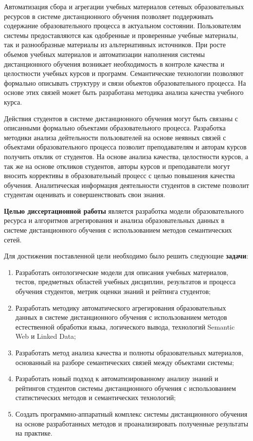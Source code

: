 Автоматизация сбора и агрегации учебных материалов сетевых образовательных ресурсов в системе дистанционного обучения позволяет поддерживать содержание образовательного процесса в актуальном состоянии. Пользователям системы предоставляются как одобренные и проверенные учебные материалы, так и разнообразные материалы из альтернативных источников. При росте объемов учебных материалов и автоматизации наполнения системы дистанционного обучения возникает необходимость в контроле качества и целостности учебных курсов и программ. Семантические технологии позволяют формально описывать структуру и связи объектов образовательного процесса. На основе этих связей может быть разработана методика анализа качества учебного курса. 

Действия студентов в системе дистанционного обучения могут быть связаны с описанными формально объектами образовательного процесса. Разработка методики анализа дейтельности пользователей на основе неявных связей с объектами образовательного процесса позволит преподавателям и авторам курсов получить отклик от студентов. На основе анализа качества, целостности курсов, а так же на основе откликов студентов, авторы курсов и преподаватели могут вносить коррективы в образовательный процесс с целью повышения качества обучения. Аналитическая информация деятельности студентов в системе позволит студентам оценивать и совершенствовать свои знания.     

\textbf{Целью диссертационной работы} является разработка модели образовательного ресурса и алгоритмов агрегирования и анализа образовательных данных в системе дистанционного обучения с использованием методов семантических сетей. 

Для достижения поставленной цели необходимо было решить следующие \textbf{задачи}:
\begin{enumerate}
 \item Разработать онтологические модели для описания учебных материалов, тестов, предметных областей учебных дисциплин, результатов и процесса обучения студентов, метрик оценки знаний и рейтинга студентов;
 \item Разработать методику автоматического агрегирования образовательных данных в системе дистанционного обучения с использованием методов естественной обработки языка, логического вывода, технологий Semantic Web и Linked Data;
 \item Разработать метод анализа качества и полноты образовательных материалов, основанный на разборе семантических связей между объектами системы;
  \item Разработать новый подход к автоматизированному анализу знаний и рейтингов студентов системы дистанционного обучения с использованием статистических методов и семантических технологий;
  \item Создать программно-аппаратный комплекс системы дистанционного обучения на основе разработанных методов и проанализировать полученные результаты на практике.  
 \end{enumerate}

